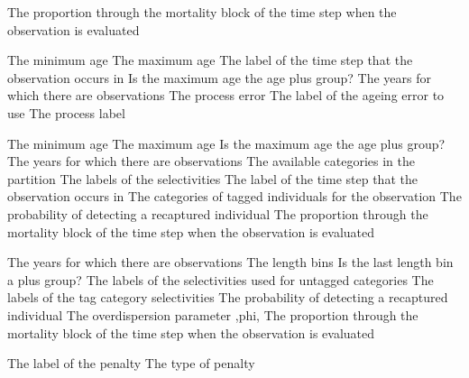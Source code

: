  {The proportion through the mortality block of the time step when the observation is evaluated}
\par\textbf{}\par
{} {The minimum age}
 {The maximum age}
 {The label of the time step that the observation occurs in}
 {Is the maximum age the age plus group?}
 {The years for which there are observations}
 {The process error}
 {The label of the ageing error to use}
 {The process label}
\par\textbf{}\par
{} {The minimum age}
 {The maximum age}
 {Is the maximum age the age plus group?}
 {The years for which there are observations}
 {The available categories in the partition}
 {The labels of the selectivities}
 {The label of the time step that the observation occurs in}
 {The categories of tagged individuals for the observation}
 {The probability of detecting a recaptured individual}
 {The proportion through the mortality block of the time step when the observation is evaluated}
\par\textbf{}\par
{} {The years for which there are observations}
 {The length bins}
 {Is the last length bin a plus group?}
 {The labels of the selectivities used for untagged categories}
 {The labels of the tag category selectivities}
 {The probability of detecting a recaptured individual}
 {The overdispersion parameter ,phi,}
 {The proportion through the mortality block of the time step when the observation is evaluated}
\par\par
{} {The label of the penalty}
 {The type of penalty}
\par\textbf{}\par
